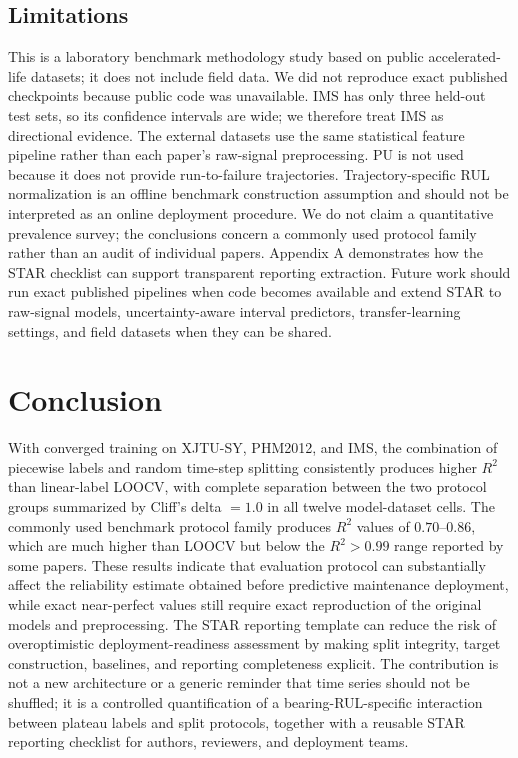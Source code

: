 \documentclass[pdflatex,sn-mathphys-num]{sn-jnl}
\begin{document}
\subsection{Limitations}
This is a laboratory benchmark methodology study based on public accelerated-life datasets; it does not include field data. We did not reproduce exact published checkpoints because public code was unavailable. IMS has only three held-out test sets, so its confidence intervals are wide; we therefore treat IMS as directional evidence. The external datasets use the same statistical feature pipeline rather than each paper's raw-signal preprocessing. PU is not used because it does not provide run-to-failure trajectories. Trajectory-specific RUL normalization is an offline benchmark construction assumption and should not be interpreted as an online deployment procedure. We do not claim a quantitative prevalence survey; the conclusions concern a commonly used protocol family rather than an audit of individual papers. Appendix A demonstrates how the STAR checklist can support transparent reporting extraction. Future work should run exact published pipelines when code becomes available and extend STAR to raw-signal models, uncertainty-aware interval predictors, transfer-learning settings, and field datasets when they can be shared.

\section{Conclusion}
With converged training on XJTU-SY, PHM2012, and IMS, the combination of piecewise labels and random time-step splitting consistently produces higher $R^2$ than linear-label LOOCV, with complete separation between the two protocol groups summarized by Cliff's delta $=1.0$ in all twelve model-dataset cells. The commonly used benchmark protocol family produces $R^2$ values of $0.70$--$0.86$, which are much higher than LOOCV but below the $R^2>0.99$ range reported by some papers. These results indicate that evaluation protocol can substantially affect the reliability estimate obtained before predictive maintenance deployment, while exact near-perfect values still require exact reproduction of the original models and preprocessing. The STAR reporting template can reduce the risk of overoptimistic deployment-readiness assessment by making split integrity, target construction, baselines, and reporting completeness explicit. The contribution is not a new architecture or a generic reminder that time series should not be shuffled; it is a controlled quantification of a bearing-RUL-specific interaction between plateau labels and split protocols, together with a reusable STAR reporting checklist for authors, reviewers, and deployment teams.
\end{document}
